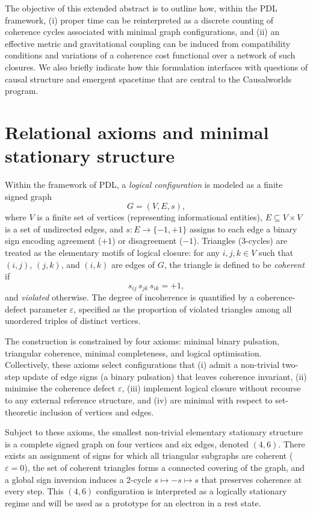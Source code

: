 \documentclass[11pt,a4paper]{article}
\begin{document}
The objective of this extended abstract is to outline how, within the PDL framework, (i) proper time can be reinterpreted as a discrete counting of coherence cycles associated with minimal graph configurations, and (ii) an effective metric and gravitational coupling can be induced from compatibility conditions and variations of a coherence cost functional over a network of such closures. We also briefly indicate how this formulation interfaces with questions of causal structure and emergent spacetime that are central to the Causalworlds program.

\section{Relational axioms and minimal stationary structure}

Within the framework of PDL, a \emph{logical configuration} is modeled as a finite signed graph
\[
G = (V,E,s),
\]
where $V$ is a finite set of vertices (representing informational entities), $E \subseteq V \times V$ is a set of undirected edges, and $s : E \to \{-1,+1\}$ assigns to each edge a binary sign encoding agreement ($+1$) or disagreement ($-1$). Triangles (3-cycles) are treated as the elementary motifs of logical closure: for any $i,j,k \in V$ such that $(i,j)$, $(j,k)$, and $(i,k)$ are edges of $G$, the triangle is defined to be \emph{coherent} if
\[
s_{ij}\, s_{jk}\, s_{ik} = +1,
\]
and \emph{violated} otherwise. The degree of incoherence is quantified by a coherence-defect parameter $\varepsilon$, specified as the proportion of violated triangles among all unordered triples of distinct vertices.

The construction is constrained by four axioms: minimal binary pulsation, triangular coherence, minimal completeness, and logical optimisation. Collectively, these axioms select configurations that (i) admit a non-trivial two-step update of edge signs (a binary pulsation) that leaves coherence invariant, (ii) minimise the coherence defect $\varepsilon$, (iii) implement logical closure without recourse to any external reference structure, and (iv) are minimal with respect to set-theoretic inclusion of vertices and edges.

Subject to these axioms, the smallest non-trivial elementary stationary structure is a complete signed graph on four vertices and six edges, denoted $(4,6)$. There exists an assignment of signs for which all triangular subgraphs are coherent ($\varepsilon = 0$), the set of coherent triangles forms a connected covering of the graph, and a global sign inversion induces a 2-cycle $s \mapsto -s \mapsto s$ that preserves coherence at every step. This $(4,6)$ configuration is interpreted as a logically stationary regime and will be used as a prototype for an electron in a rest state.
\end{document}
